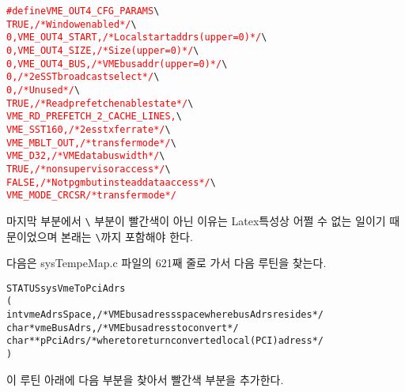 \documentclass[11pt,a4paper]{article}
\begin{document}
\begin{framed}
\begin{alltt}
\textcolor{red}{#define VME_OUT4_CFG_PARAMS} \verb|\|
\textcolor{red}{             TRUE,                   /* Window enabled */ }\verb|\|
\textcolor{red}{             0, VME_OUT4_START,      /* Local start addrs (upper = 0) */ }\verb|\|
\textcolor{red}{             0, VME_OUT4_SIZE,       /* Size (upper = 0) */ }\verb|\|
\textcolor{red}{             0, VME_OUT4_BUS,        /* VME bus addr (upper = 0) */ }\verb|\|
\textcolor{red}{             0,                      /* 2eSST broadcast select */ }\verb|\|
\textcolor{red}{             0,                      /* Unused */ }\verb|\|
\textcolor{red}{             TRUE,                   /* Read prefetch enable state */ }\verb|\|
\textcolor{red}{             VME_RD_PREFETCH_2_CACHE_LINES, }\verb|\|
\textcolor{red}{             VME_SST160,             /* 2esst xfer rate */} \verb|\|
\textcolor{red}{             VME_MBLT_OUT,           /* transfer mode */} \verb|\|
\textcolor{red}{             VME_D32,                /* VME data bus width */} \verb|\|
\textcolor{red}{             TRUE,                   /* nonsupervisor access */} \verb|\|
\textcolor{red}{             FALSE,                  /* Not pgm but instead data access */} \verb|\|
\textcolor{red}{             VME_MODE_CRCSR            /* transfer mode */}

\end{alltt}
\end{framed}

마지막 부분에서 \verb|\| 부분이 빨간색이 아닌 이유는 Latex특성상 어쩔 수 없는 일이기 때문이었으며 본래는 \verb|\|까지 포함해야 한다.

다음은 sysTempeMap.c 파일의 621째 줄로 가서 다음 루틴을 찾는다.
\begin{framed}
\begin{alltt}
STATUS sysVmeToPciAdrs
    (
    int     vmeAdrsSpace, /* VME bus adress space where busAdrs resides */
    char *  vmeBusAdrs,   /* VME bus adress to convert */
    char ** pPciAdrs      /* where to return converted local (PCI) adress */
    )
\end{alltt}
\end{framed}

이 루틴 아래에 다음 부분을 찾아서 빨간색 부분을 추가한다.
\end{document}
